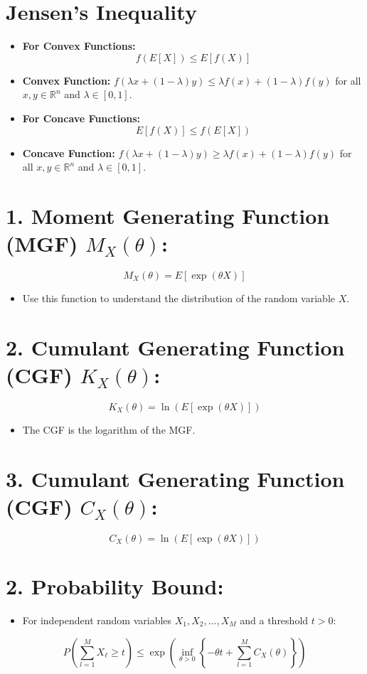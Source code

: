 \documentclass{article}
\begin{document}
\section*{Jensen's Inequality}

\begin{itemize}
    \item \textbf{For Convex Functions:} 
    \[
    f(E[X]) \leq E[f(X)]
    \]
    \item \textbf{Convex Function:} \( f(\lambda x + (1 - \lambda)y) \leq \lambda f(x) + (1 - \lambda)f(y) \) for all \( x, y \in \mathbb{R}^n \) and \( \lambda \in [0, 1]. \)

    \item \textbf{For Concave Functions:} 
    \[
    E[f(X)] \leq f(E[X])
    \]
    \item \textbf{Concave Function:} \( f(\lambda x + (1 - \lambda)y) \geq \lambda f(x) + (1 - \lambda)f(y) \) for all \( x, y \in \mathbb{R}^n \) and \( \lambda \in [0, 1]. \)
\end{itemize}

\section*{1. Moment Generating Function (MGF) \( M_X(\theta) \):}
\[
M_X(\theta) = E[\exp(\theta X)]
\]
\begin{itemize}
    \item Use this function to understand the distribution of the random variable \( X \).
\end{itemize}

\section*{2. Cumulant Generating Function (CGF) \( K_X(\theta) \):}
\[
K_X(\theta) = \ln(E[\exp(\theta X)])
\]
\begin{itemize}
    \item The CGF is the logarithm of the MGF.
\end{itemize}

\section*{3. Cumulant Generating Function (CGF) \( C_X(\theta) \):}
\[
C_X(\theta) = \ln(E[\exp(\theta X)])
\]

\section*{2. Probability Bound:}
\begin{itemize}
    \item For independent random variables \( X_1, X_2, \ldots, X_M \) and a threshold \( t > 0 \):
\end{itemize}
\[
P\left(\sum_{l=1}^{M} X_\ell \geq t\right) \leq \exp\left(\inf_{\theta > 0}\left\{-\theta t + \sum_{l=1}^{M} C_X(\theta)\right\}\right)
\]
\end{document}
